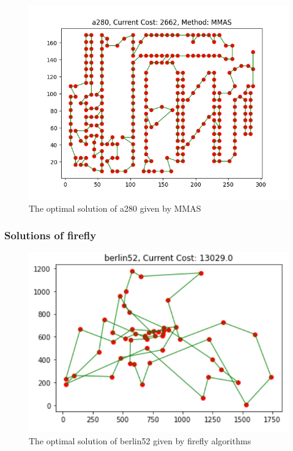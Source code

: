 \documentclass[twocolumn, a4paper]{extarticle}
\begin{document}
\begin{figure}[H]
	\centering
	\includegraphics[width=0.95\linewidth]{figure/mmas_a280}
	\caption{The optimal solution of a280 given by MMAS}
	\label{fig:mmasa280}
\end{figure}




\subsubsection{Solutions of firefly}

\begin{figure}[H]
	\centering
	\includegraphics[width=0.95\linewidth]{figure/fire_berlin52}
	\caption{The optimal solution of berlin52 given by firefly algorithms}
	\label{fig:fireberlin52}
\end{figure}
\end{document}
